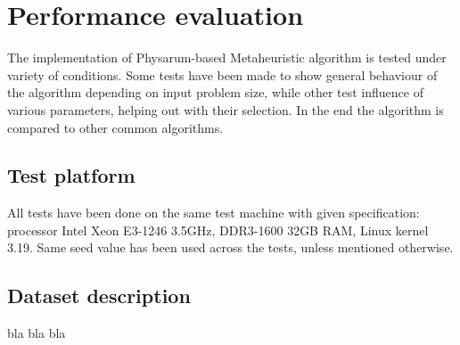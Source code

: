 \section{Performance evaluation}
\label{section:project_evaluation}

The implementation of Physarum-based Metaheuristic algorithm is tested under variety of conditions. Some tests have been made to show general behaviour of the algorithm depending on input problem size, while other test influence of various parameters, helping out with their selection. In the end the algorithm is compared to other common algorithms.


\subsection{Test platform}

All tests have been done on the same test machine with given specification: processor Intel Xeon E3-1246 3.5GHz, DDR3-1600 32GB RAM, Linux kernel 3.19. Same seed value has been used across the tests, unless mentioned otherwise.


\subsection{Dataset description}

bla bla bla



